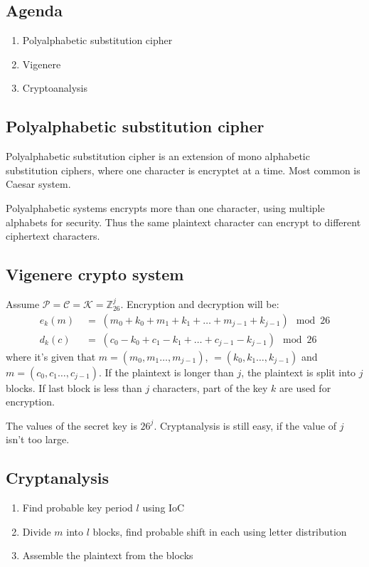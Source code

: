 

\subsection*{Agenda}
\begin{enumerate}
\item Polyalphabetic substitution cipher
\item Vigenere
\item Cryptoanalysis
\end{enumerate}

\subsection{Polyalphabetic substitution cipher}
Polyalphabetic substitution cipher is an extension of mono alphabetic
substitution ciphers, where one character is encryptet at a time. Most
common is Caesar system.

Polyalphabetic systems encrypts more than one character, using
multiple alphabets for security. Thus the same plaintext character can
encrypt to different ciphertext characters.

\subsection{Vigenere crypto system}
Assume $\mathcal{P} = \mathcal{C} = \mathcal{K} =
\mathbb{Z}_{26}^j$. Encryption and decryption will be:
\begin{align*}
  e_{k}(m) \; &= \; (m_0+k_0 +m_1+k_1 + \ldots
  +m_{j-1}+k_{j-1} )  \mod 26\\
  d_{k}(c) \; &= \; (c_0-k_0 +c_1-k_1 + \ldots +c_{j-1}-k_{j-1} ) \mod 26
\end{align*}
where it's given that $m=(m_0,m_1 \ldots,m_{j-1})$, $=(k_0,k_1
\ldots,k_{j-1})$ and $m=(c_0,c_1 \ldots,c_{j-1})$. If the plaintext is
longer than $j$, the plaintext is split into $j$ blocks. If last block
is less than $j$ characters, part of the key $k$ are used for
encryption.

The values of the secret key is $26^j$. Cryptanalysis is still easy,
if the value of $j$ isn't too large.

\subsection{Cryptanalysis}
\begin{enumerate}
\item Find probable key period $l$ using IoC
\item Divide $m$ into $l$ blocks, find probable shift in each using
  letter distribution
\item Assemble the plaintext from the blocks
\end{enumerate}

